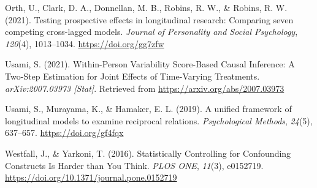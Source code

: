 \documentclass[
  english,
  man,floatsintext]{apa6}
\newlength{\cslhangindent}
\newlength{\cslentryspacingunit} %
\newenvironment{CSLReferences}[2] %
 {%
  \setlength{\parindent}{0pt}
  \ifodd #1
  \let\oldpar\par
  \def\par{\hangindent=\cslhangindent\oldpar}
  \fi
  \setlength{\parskip}{#2\cslentryspacingunit}
 }%
 {}
\begin{document}
\begin{CSLReferences}{1}{0}
\leavevmode{}%
Orth, U., Clark, D. A., Donnellan, M. B., Robins, R. W., \& Robins, R. W. (2021). Testing prospective effects in longitudinal research: {Comparing} seven competing cross-lagged models. \emph{Journal of Personality and Social Psychology}, \emph{120}(4), 1013--1034. \url{https://doi.org/gg7zfw}

\leavevmode{}%
Usami, S. (2021). Within-{Person Variability Score}-{Based Causal Inference}: {A Two}-{Step Estimation} for {Joint Effects} of {Time}-{Varying Treatments}. \emph{arXiv:2007.03973 {[}Stat{]}}. Retrieved from \url{https://arxiv.org/abs/2007.03973}

\leavevmode{}%
Usami, S., Murayama, K., \& Hamaker, E. L. (2019). A unified framework of longitudinal models to examine reciprocal relations. \emph{Psychological Methods}, \emph{24}(5), 637--657. \url{https://doi.org/gf4fqx}

\leavevmode{}%
Westfall, J., \& Yarkoni, T. (2016). Statistically {Controlling} for {Confounding Constructs Is Harder} than {You Think}. \emph{PLOS ONE}, \emph{11}(3), e0152719. \url{https://doi.org/10.1371/journal.pone.0152719}

\end{CSLReferences}
\end{document}
